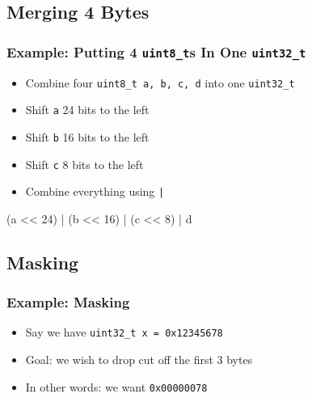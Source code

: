 \subsection{Merging 4 Bytes}
\frame{\tableofcontents[currentsubsection]}

\begin{frame}
  \frametitle{Example: Putting 4 \texttt{uint8\_t}s In One \texttt{uint32\_t}}
  \begin{itemize}
    \item Combine four \texttt{uint8\_t a, b, c, d} into one \texttt{uint32\_t}
    \item Shift \texttt{a} 24 bits to the left
    \item Shift \texttt{b} 16 bits to the left
    \item Shift \texttt{c} 8 bits to the left
    \item Combine everything using \texttt{|}
  \end{itemize}
  \begin{center} \ttfamily
    (a << 24) | (b << 16) | (c << 8) | d
  \end{center}
\end{frame}

\subsection{Masking}
\frame{\tableofcontents[currentsubsection]}

\begin{frame}
  \frametitle{Example: Masking}
  \begin{itemize}
    \item Say we have \texttt{uint32\_t x = 0x12345678}
    \item Goal: we wish to drop cut off the first 3 bytes
    \item In other words: we want \texttt{0x00000078}
  \end{itemize}
\end{frame}

